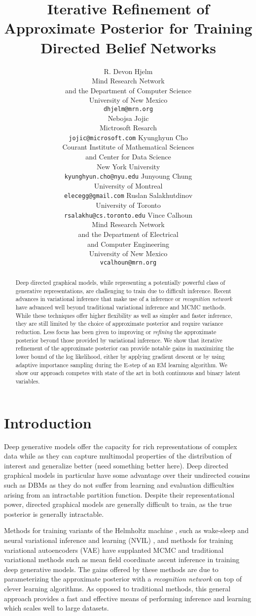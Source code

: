 \documentclass{article} %
\title{Iterative Refinement of Approximate Posterior for Training Directed Belief Networks}
\author{R. Devon Hjelm \\
Mind Research Network \\
and the Department of Computer Science \\
University of New Mexico \\
\texttt{dhjelm@mrn.org} \\
\And
Nebojsa Jojic \\
Mictrosoft Resarch \\
\texttt{jojic@microsoft.com}
\And
Kyunghyun Cho \\
Courant Institute of Mathematical Sciences \\ 
and Center for Data Science \\
New York University \\
\texttt{kyunghyun.cho@nyu.edu}
\And
Junyoung Chung \\
University of Montreal \\
\texttt{elecegg@gmail.com}
\And
Ruslan Salakhutdinov \\
University of Toronto \\
\texttt{rsalakhu@cs.toronto.edu}
\And
Vince Calhoun \\
Mind Research Network \\
and the Department of Electrical \\ 
and Computer Engineering \\
University of New Mexico \\
\texttt{vcalhoun@mrn.org}
}
\begin{document}
\maketitle

\begin{abstract}
    Deep directed graphical models, while representing a potentially powerful class of generative representations, are challenging to train due to difficult inference. Recent advances in variational inference that make use of a inference or \emph{recognition network} have advanced well beyond traditional variational inference and MCMC methods. While these techniques offer higher flexibility as well as simpler and faster inference, they are still limited by the choice of approximate posterior and require variance reduction. Less focus has been given to improving or \emph{refining} the approximate posterior beyond those provided by variational inference. We show that iterative refinement of the approximate posterior can provide notable gains in maximizing the lower bound of the log likelihood, either by applying gradient descent or by using adaptive importance sampling during the E-step of an EM learning algorithm. We show our approach competes with state of the art in both continuous and binary latent variables.
    \end{abstract}

\section{Introduction}

Deep generative models offer the capacity for rich representations of complex data while as they can capture multimodal properties of the distribution of interest and generalize better (need something better here). Deep directed graphical models in particular have some advantage over their undirected cousins such as DBMs \citep{salakhutdinov2009deep} as they do not suffer from learning and evaluation difficulties arising from an intractable partition function. Despite their representational power, directed graphical models are generally difficult to train, as the true posterior is generally intractable.

Methods for training variants of the Helmholtz machine \citep{dayan1995helmholtz}, such as wake-sleep \citep{hinton1995wake, bornschein2014reweighted} and neural variational inference and learning (NVIL) \citep{mnih2014neural}, and methods for training variational autoencoders (VAE) \citep{kingma2013auto} have supplanted MCMC and traditional variational methods such as mean field coordinate ascent inference in training deep generative models. The gains offered by these methods are due to parameterizing the approximate posterior with a \emph{recognition network} on top of clever learning algorithms. As opposed to traditional methods, this general approach provides a fast and effective means of performing inference and learning which scales well to large datasets.
\end{document}
